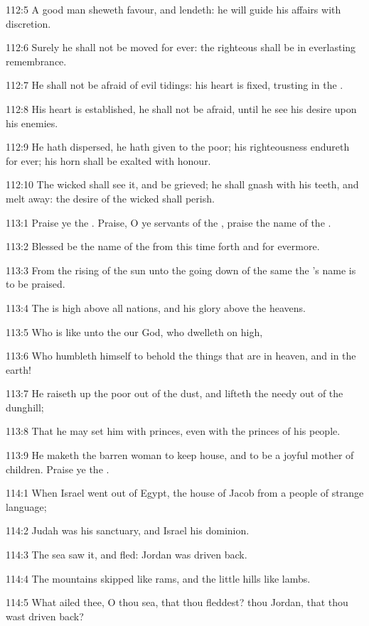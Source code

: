 112:5 A good man sheweth favour, and lendeth: he will guide his affairs with discretion.

112:6 Surely he shall not be moved for ever: the righteous shall be in everlasting remembrance.

112:7 He shall not be afraid of evil tidings: his heart is fixed, trusting in the \LORD.

112:8 His heart is established, he shall not be afraid, until he see his desire upon his enemies.

112:9 He hath dispersed, he hath given to the poor; his righteousness endureth for ever; his horn shall be exalted with honour.

112:10 The wicked shall see it, and be grieved; he shall gnash with his teeth, and melt away: the desire of the wicked shall perish.



113:1 Praise ye the \LORD. Praise, O ye servants of the \LORD, praise the name of the \LORD.

113:2 Blessed be the name of the \LORD from this time forth and for evermore.

113:3 From the rising of the sun unto the going down of the same the \LORD's name is to be praised.

113:4 The \LORD is high above all nations, and his glory above the heavens.

113:5 Who is like unto the \LORD our God, who dwelleth on high,

113:6 Who humbleth himself to behold the things that are in heaven, and in the earth!

113:7 He raiseth up the poor out of the dust, and lifteth the needy out of the dunghill;

113:8 That he may set him with princes, even with the princes of his people.

113:9 He maketh the barren woman to keep house, and to be a joyful mother of children. Praise ye the \LORD.



114:1 When Israel went out of Egypt, the house of Jacob from a people of strange language;

114:2 Judah was his sanctuary, and Israel his dominion.

114:3 The sea saw it, and fled: Jordan was driven back.

114:4 The mountains skipped like rams, and the little hills like lambs.

114:5 What ailed thee, O thou sea, that thou fleddest? thou Jordan, that thou wast driven back?


